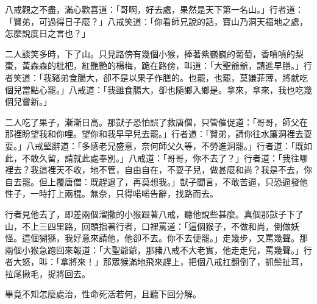 八戒觀之不盡，滿心歡喜道：「哥啊，好去處，果然是天下第一名山。」行者道：「賢弟，可過得日子麼？」八戒笑道：「你看師兄說的話，寶山乃洞天福地之處，怎麼說度日之言也？」

二人談笑多時，下了山。只見路傍有幾個小猴，捧著紫巍巍的葡萄，香噴噴的梨棗，黃森森的枇杷，紅艷艷的楊梅，跪在路傍，叫道：「大聖爺爺，請進早膳。」行者笑道：「我豬弟食腸大，卻不是以果子作膳的。也罷，也罷，莫嫌菲薄，將就吃個兒當點心罷。」八戒道：「我雖食腸大，卻也隨鄉入鄉是。拿來，拿來，我也吃幾個兒嘗新。」

二人吃了果子，漸漸日高。那獃子恐怕誤了救唐僧，只管催促道：「哥哥，師父在那裡盼望我和你哩。望你和我早早兒去罷。」行者道：「賢弟，請你往水簾洞裡去耍耍。」八戒堅辭道：「多感老兄盛意，奈何師父久等，不勞進洞罷。」行者道：「既如此，不敢久留，請就此處奉別。」八戒道：「哥哥，你不去了？」行者道：「我往哪裡去？我這裡天不收，地不管，自由自在，不耍子兒，做甚麼和尚？我是不去，你自去罷。但上覆唐僧：既趕退了，再莫想我。」獃子聞言，不敢苦逼，只恐逼發他性子，一時打上兩棍。無奈，只得喏喏告辭，找路而去。

行者見他去了，即差兩個溜撒的小猴跟著八戒，聽他說些甚麼。真個那獃子下了山，不上三四里路，回頭指著行者，口裡罵道：「這個猴子，不做和尚，倒做妖怪。這個猢猻，我好意來請他，他卻不去。你不去便罷。」走幾步，又罵幾聲。那兩個小猴急跑回來報道：「大聖爺爺，那豬八戒不大老實，他走走兒，罵幾聲。」行者大怒，叫：「拿將來！」那眾猴滿地飛來趕上，把個八戒扛翻倒了，抓鬃扯耳，拉尾揪毛，捉將回去。

畢竟不知怎麼處治，性命死活若何，且聽下回分解。
